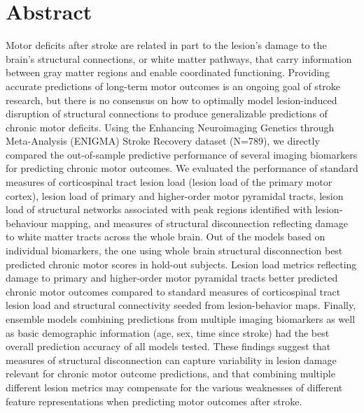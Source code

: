 \documentclass[10pt]{article}
\begin{document}
\section{Abstract}
 Motor deficits after stroke are related in part to the lesion's damage to the brain's structural connections, or white matter pathways, that carry information between gray matter regions and enable coordinated functioning. Providing accurate predictions of long-term motor outcomes  is an ongoing goal of stroke research, but there is no consensus on how to optimally model lesion-induced disruption of structural connections to produce generalizable predictions of chronic motor deficits. Using the Enhancing Neuroimaging Genetics through Meta-Analysis (ENIGMA) Stroke Recovery dataset (N=789), we directly compared the out-of-sample predictive performance of several imaging biomarkers for predicting chronic motor outcomes. We evaluated the performance of standard measures of corticospinal tract lesion load (lesion load of the primary motor cortex), lesion load of primary and higher-order motor pyramidal tracts, lesion load of structural networks associated with peak regions identified with lesion-behaviour mapping, and measures of structural disconnection reflecting damage to white matter tracts across the whole brain. Out of the models based on individual biomarkers, the one using whole brain structural disconnection best predicted chronic motor scores in hold-out subjects. Lesion load metrics reflecting damage to primary and higher-order motor pyramidal tracts better predicted chronic motor outcomes compared to standard measures of corticospinal tract lesion load and structural connectivity seeded from lesion-behavior maps. Finally, ensemble models combining predictions from multiple imaging biomarkers as well as basic demographic information (age, sex, time since stroke) had the best overall prediction accuracy of all models tested. These findings suggest that measures of structural disconnection can capture variability in lesion damage relevant for chronic motor outcome predictions, and that combining multiple different lesion metrics may compensate for the various weaknesses of different feature representations when predicting motor outcomes after stroke.
\end{document}
